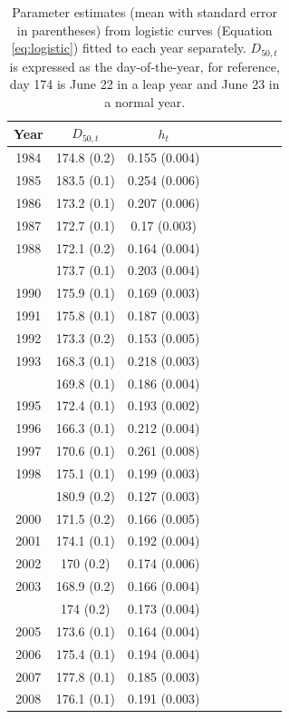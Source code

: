 \documentclass[12pt,]{book}
\theoremstyle{definition}
\theoremstyle{definition}
\theoremstyle{definition}
\theoremstyle{remark}
\begin{document}
\begin{singlespace}

\begin{table}

\caption{\label{tab:rt-ests-table}Parameter estimates (mean with standard error in parentheses) from
      logistic curves (Equation \ref{eq:logistic}) fitted to each year separately. $D_{50,t}$ is expressed
      as the day-of-the-year, for reference, day 174 is June 22 in a leap year and June 23 in a normal year.}
\centering
\begin{tabular}[t]{ccccccccc}
\toprule
Year & $D_{50,t}$ & $h_t$\\
\midrule
1984 & 174.8 (0.2) & 0.155 (0.004)\\
1985 & 183.5 (0.1) & 0.254 (0.006)\\
1986 & 173.2 (0.1) & 0.207 (0.006)\\
1987 & 172.7 (0.1) & 0.17 (0.003)\\
1988 & 172.1 (0.2) & 0.164 (0.004)\\
\addlinespace
1989 & 173.7 (0.1) & 0.203 (0.004)\\
1990 & 175.9 (0.1) & 0.169 (0.003)\\
1991 & 175.8 (0.1) & 0.187 (0.003)\\
1992 & 173.3 (0.2) & 0.153 (0.005)\\
1993 & 168.3 (0.1) & 0.218 (0.003)\\
\addlinespace
1994 & 169.8 (0.1) & 0.186 (0.004)\\
1995 & 172.4 (0.1) & 0.193 (0.002)\\
1996 & 166.3 (0.1) & 0.212 (0.004)\\
1997 & 170.6 (0.1) & 0.261 (0.008)\\
1998 & 175.1 (0.1) & 0.199 (0.003)\\
\addlinespace
1999 & 180.9 (0.2) & 0.127 (0.003)\\
2000 & 171.5 (0.2) & 0.166 (0.005)\\
2001 & 174.1 (0.1) & 0.192 (0.004)\\
2002 & 170 (0.2) & 0.174 (0.006)\\
2003 & 168.9 (0.2) & 0.166 (0.004)\\
\addlinespace
2004 & 174 (0.2) & 0.173 (0.004)\\
2005 & 173.6 (0.1) & 0.164 (0.004)\\
2006 & 175.4 (0.1) & 0.194 (0.004)\\
2007 & 177.8 (0.1) & 0.185 (0.003)\\
2008 & 176.1 (0.1) & 0.191 (0.003)\\

\end{tabular}
\end{table}
\end{singlespace}
\end{document}
